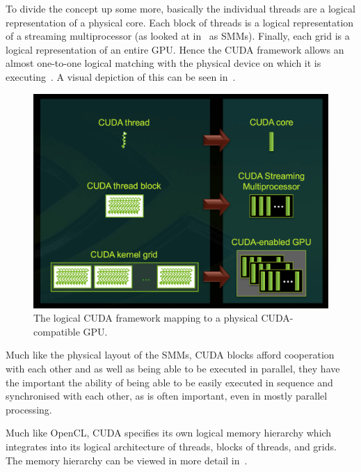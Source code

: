 \documentclass[a4paper,11pt]{article}
\begin{document}
To divide the concept up some more, basically the individual threads are a logical representation of a physical core. Each
block of threads is a logical representation of a streaming multiprocessor (as looked at in~ as SMMs).
Finally, each grid is a logical representation of an entire GPU. Hence the CUDA framework allows an almost one-to-one
logical matching with the physical device on which it is executing~\cite{slides:CUDAOverview}. A visual depiction of this can be seen in~.

\begin{figure}[ht]
  \centering
  \includegraphics[scale=0.2]{img/cuda-mapping}
  \caption{The logical CUDA framework mapping to a physical CUDA-compatible GPU.~\cite{slides:CUDAOverview}}
\label{fig:cuda-mapping}
\end{figure}

Much like the physical layout of the SMMs, CUDA blocks afford cooperation with each other and as well as being able to be
executed in parallel, they have the important the ability of being able to be easily executed in sequence and synchronised
with each other, as is often important, even in mostly parallel processing.

Much like OpenCL, CUDA specifies its own logical memory hierarchy which integrates into its logical architecture of
threads, blocks of threads, and grids. The memory hierarchy can be viewed in more detail in~.
\end{document}
